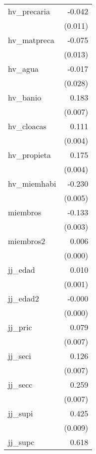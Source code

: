 {\begin{longtable}{l*{1}{D{.}{.}{-1}}}
\addlinespace
hv\_precaria &      -0.042\sym{***}\\
            &     (0.011)         \\
\addlinespace
hv\_matpreca &      -0.075\sym{***}\\
            &     (0.013)         \\
\addlinespace
hv\_agua     &      -0.017         \\
            &     (0.028)         \\
\addlinespace
hv\_banio    &       0.183\sym{***}\\
            &     (0.007)         \\
\addlinespace
hv\_cloacas  &       0.111\sym{***}\\
            &     (0.004)         \\
\addlinespace
hv\_propieta &       0.175\sym{***}\\
            &     (0.004)         \\
\addlinespace
hv\_miemhabi &      -0.230\sym{***}\\
            &     (0.005)         \\
\addlinespace
miembros    &      -0.133\sym{***}\\
            &     (0.003)         \\
\addlinespace
miembros2   &       0.006\sym{***}\\
            &     (0.000)         \\
\addlinespace
jj\_edad     &       0.010\sym{***}\\
            &     (0.001)         \\
\addlinespace
jj\_edad2    &      -0.000\sym{***}\\
            &     (0.000)         \\
\addlinespace
jj\_pric     &       0.079\sym{***}\\
            &     (0.007)         \\
\addlinespace
jj\_seci     &       0.126\sym{***}\\
            &     (0.007)         \\
\addlinespace
jj\_secc     &       0.259\sym{***}\\
            &     (0.007)         \\
\addlinespace
jj\_supi     &       0.425\sym{***}\\
            &     (0.009)         \\
\addlinespace
jj\_supc     &       0.618\sym{***}\\

\end{longtable}}
